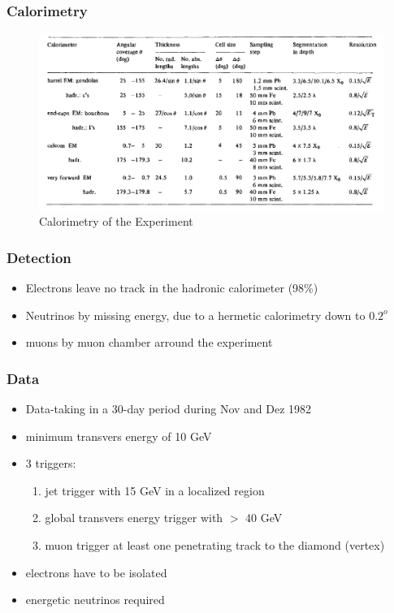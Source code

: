 \documentclass{beamer}
\begin{document}

\begin{frame}
\frametitle{Calorimetry}
\begin{figure}
  \includegraphics[width=1.0\textwidth]{calorimetry}
  \caption{Calorimetry of the Experiment}
  \label{fig:calorimetry}
\end{figure}
\end{frame}

\begin{frame}
\frametitle{Detection}
\begin{itemize}
  \item Electrons leave no track in the hadronic calorimeter (98\%)
  \item Neutrinos by missing energy, due to a hermetic calorimetry down to $0.2^o$
  \item muons by muon chamber arround the experiment
\end{itemize}
\end{frame}

\begin{frame}
\frametitle{Data}
\begin{itemize}
  \item Data-taking in a 30-day period during Nov and Dez 1982
  \item minimum transvers energy of 10 GeV
  \item 3 triggers:
  \begin{enumerate}
    \item jet trigger with 15 GeV in a localized region
    \item global transvers energy trigger with $>$ 40 GeV
    \item muon trigger at least one penetrating track to the diamond (vertex)
  \end{enumerate}
  \item electrons have to be isolated
  \item energetic neutrinos required
\end{itemize}
\end{frame}
\end{document}
